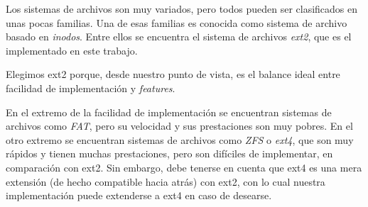 Los sistemas de archivos son muy variados, pero todos pueden ser clasificados en unas pocas familias.
Una de esas familias es conocida como sistema de archivo basado en \emph{inodos}. Entre ellos se encuentra el sistema de archivos \emph{ext2}, que es el implementado en este trabajo.

Elegimos ext2 porque, desde nuestro punto de vista, es el balance ideal entre facilidad de implementación y \emph{features}.

En el extremo de la facilidad de implementación se encuentran sistemas de archivos como \emph{FAT}, pero su velocidad y sus prestaciones son muy pobres.
En el otro extremo se encuentran sistemas de archivos como \emph{ZFS} o \emph{ext4}, que son muy rápidos y tienen muchas prestaciones, pero son difíciles de implementar, en comparación con ext2.
Sin embargo, debe tenerse en cuenta que ext4 es una mera extensión (de hecho compatible hacia atrás) con ext2, con lo cual nuestra implementación puede extenderse a ext4 en caso de desearse.


